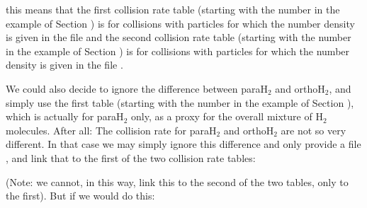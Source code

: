 \documentclass[letterpaper,10pt,english]{sphinxmanual}
\begin{document}
this means that the first collision rate table (starting with the number
 in the example of Section {\hyperref[\detokenize{lineradtrans:sec-leiden-format}]{}}) is for
collisions with particles for which the number density is given in the file
 and the second collision rate table (starting with the
number  in the example of Section {\hyperref[\detokenize{lineradtrans:sec-leiden-format}]{}}) is for
collisions with particles for which the number density is given in the file
.

We could also decide to ignore the difference between para\sphinxhyphen{}H\(_2\) and
ortho\sphinxhyphen{}H\(_2\), and simply use the first table (starting with the number
 in the example of Section {\hyperref[\detokenize{lineradtrans:sec-leiden-format}]{}}),
which is actually for para\sphinxhyphen{}H\(_2\) only, as a proxy for the overall mixture
of H\(_2\) molecules. After all: The collision rate for para\sphinxhyphen{}H\(_2\) and
ortho\sphinxhyphen{}H\(_2\) are not so very different. In that case we may simply ignore
this difference and only provide a file ,
and link that to the first of the two collision rate tables:

\begin{sphinxVerbatim}[commandchars=\\\{\}]
            
\end{sphinxVerbatim}

(Note: we cannot, in this way, link this to the second of the two tables,
only to the first). But if we would do this:

\begin{sphinxVerbatim}[commandchars=\\\{\}]
            
\end{sphinxVerbatim}
\end{document}
